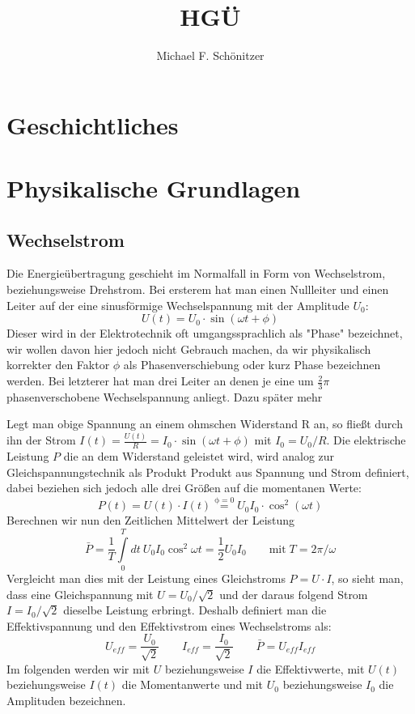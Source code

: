 \documentclass[10pt,a4paper,twoside]{article}
\author{Michael F. Schönitzer}
\title{HGÜ}
\begin{document}
\maketitle

\section{Geschichtliches}

\section{Physikalische Grundlagen}
\subsection{Wechselstrom}
Die Energieübertragung geschieht im Normalfall in Form von Wechselstrom, beziehungsweise Drehstrom. %
Bei ersterem hat man einen Nullleiter und einen Leiter auf der eine sinusförmige Wechselspannung mit der Amplitude $U_0$:
\begin{equation}
U(t)=U_0 \cdot \sin(\omega t + \phi)
\end{equation}
Dieser wird in der Elektrotechnik oft umgangssprachlich als "Phase" bezeichnet, wir wollen davon hier jedoch nicht Gebrauch machen, da wir physikalisch korrekter den Faktor $\phi$ als Phasenverschiebung oder kurz Phase bezeichnen werden.
Bei letzterer hat man drei Leiter an denen je eine um $\frac23\pi$ phasenverschobene Wechselspannung anliegt. Dazu später mehr %

Legt man obige Spannung an einem ohmschen Widerstand R an, so fließt durch ihn der Strom $I(t)= \frac{U(t)}{R} = I_0 \cdot \sin(\omega t + \phi)$ mit $I_0 = U_0/R$.
Die elektrische Leistung $P$ die an dem Widerstand geleistet wird, wird analog zur Gleichspannungstechnik als Produkt Produkt aus Spannung und Strom definiert, dabei beziehen sich jedoch alle drei Größen auf die momentanen Werte:
\begin{equation}
P(t) = U(t) \cdot I(t) \stackrel{\mathrm{\phi=0}}= U_0 I_0 \cdot \cos^2(\omega t)
\end{equation}
Berechnen wir nun den Zeitlichen Mittelwert der Leistung
\begin{equation}
\bar{P}=\frac1T \int\limits_0^T dt\: U_0 I_0 \cos^2 \omega t = \frac12 U_0 I_0 \qquad\mathrm{mit}\; T=2\pi/\omega
\end{equation}
Vergleicht man dies mit der Leistung eines Gleichstroms $P=U\cdot I$, so sieht man, dass eine Gleichspannung mit $U=U_0 / \sqrt2$ und der daraus folgend Strom $I=I_0 / \sqrt2$ dieselbe Leistung erbringt.
Deshalb definiert man die Effektivspannung und den Effektivstrom eines Wechselstroms als:
\begin{equation*}
U_{eff} = \frac{U_0}{\sqrt2} \qquad I_{eff} = \frac{I_0}{\sqrt2} \qquad \bar{P}=U_{eff}I_{eff}
\end{equation*}
Im folgenden werden wir mit $U$ beziehungsweise $I$ die Effektivwerte, mit $U(t)$ beziehungsweise $I(t)$ die Momentanwerte und mit $U_0$ beziehungsweise $I_0$ die Amplituden bezeichnen.
\end{document}
